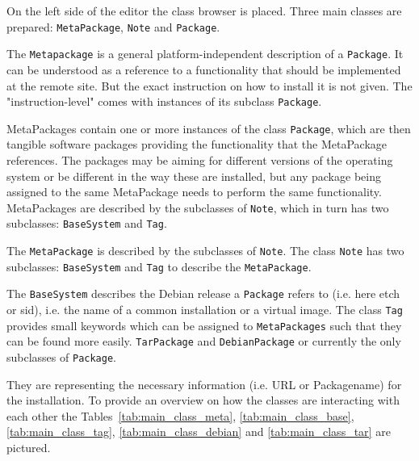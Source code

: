 On the left side of the editor the class browser is placed. Three
main classes are prepared: \texttt{MetaPackage}, \texttt{Note} and
\texttt{Package}.

The \texttt{Metapackage} is a general platform-independent description
of a \texttt{Package}. It can be understood as a reference to a functionality
that should be implemented at the remote site. But the exact instruction
on how to install it is not given.  The "instruction-level" comes with
instances of its subclass \texttt{Package}.

MetaPackages contain one or more instances of the class
\texttt{Package}, which are then tangible software packages providing
the functionality that the MetaPackage references. The packages may
be aiming for different versions of the operating system or be different
in the way these are installed, but any package being assigned to the same
MetaPackage needs to perform the same functionality.
MetaPackages are described by the subclasses of \texttt{Note}, which
in turn has two subclasses: \texttt{BaseSystem} and
\texttt{Tag}.

The \texttt{MetaPackage} is described by the subclasses of \texttt{Note}.
The class \texttt{Note} has two subclasses: \texttt{BaseSystem} 
and \texttt{Tag} to describe the \texttt{MetaPackage}.

The \texttt{BaseSystem} describes the Debian release a \texttt{Package}
refers to (i.e. here etch or sid), i.e. the name of a common installation
or a virtual image.
The class \texttt{Tag} provides small keywords which can be assigned to
\texttt{MetaPackages} such that they can be found more easily.
\texttt{TarPackage} and \texttt{DebianPackage}
or currently the only subclasses of \texttt{Package}.

They are representing the necessary information (i.e. URL or Packagename)
for the installation.
To provide an overview on how the classes are
interacting with each other the Tables~\ref{tab:main_class_meta},
\ref{tab:main_class_base}, \ref{tab:main_class_tag},
\ref{tab:main_class_debian} and \ref{tab:main_class_tar} are pictured.


